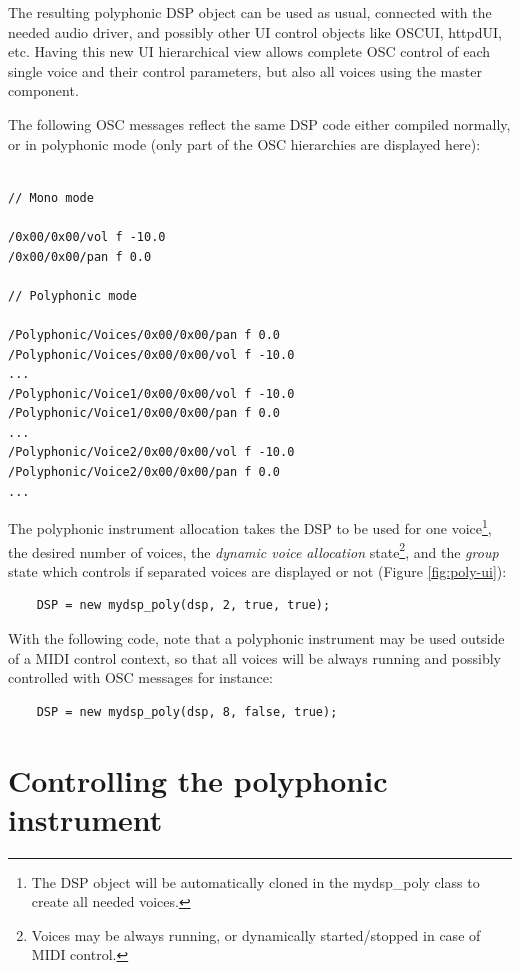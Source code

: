 The resulting polyphonic DSP object can be used as usual, connected with the needed audio driver, and possibly other UI control objects like OSCUI, httpdUI, etc. Having this new UI hierarchical view allows complete OSC control of each single voice and their control parameters, but also all voices using the master component. 

The following OSC messages reflect the same DSP code either compiled normally,  or in polyphonic mode (only part of the OSC hierarchies are displayed here):

\footnotesize
\begin{lstlisting}

// Mono mode

/0x00/0x00/vol f -10.0
/0x00/0x00/pan f 0.0

// Polyphonic mode

/Polyphonic/Voices/0x00/0x00/pan f 0.0
/Polyphonic/Voices/0x00/0x00/vol f -10.0
...
/Polyphonic/Voice1/0x00/0x00/vol f -10.0
/Polyphonic/Voice1/0x00/0x00/pan f 0.0
...
/Polyphonic/Voice2/0x00/0x00/vol f -10.0
/Polyphonic/Voice2/0x00/0x00/pan f 0.0
...
\end{lstlisting}
\normalsize

The polyphonic instrument allocation takes the DSP to be used for one voice\footnote{The DSP object will be automatically cloned in the mydsp\_poly class to create all needed voices.},  the desired number of voices, the {\it dynamic voice allocation} state\footnote{Voices may be always running, or dynamically started/stopped in case of MIDI control.},  and the {\it group} state which controls if separated voices are displayed or not (Figure \ref{fig:poly-ui}): 

\footnotesize
\begin{lstlisting}
    DSP = new mydsp_poly(dsp, 2, true, true);  
\end{lstlisting}
    
\normalsize
With the following code, note that a polyphonic instrument may be used outside of a MIDI control context, so that all voices will be always running and possibly controlled with OSC messages for instance:

\footnotesize
\begin{lstlisting}
    DSP = new mydsp_poly(dsp, 8, false, true);
\end{lstlisting}

\normalsize
    
\section{Controlling the polyphonic instrument}

